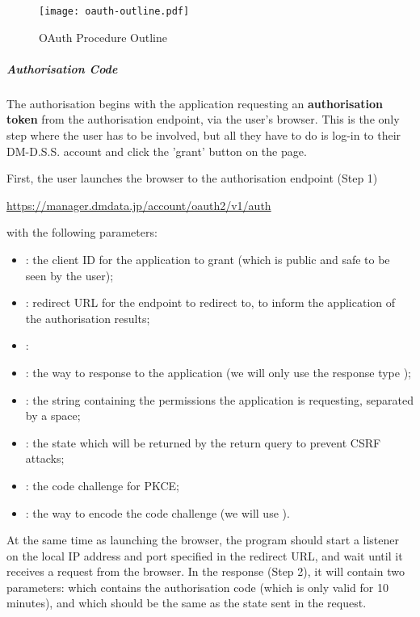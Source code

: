 \begin{figure}[htp]
    \centering
    \texttt{[image: oauth-outline.pdf]}
    \caption{OAuth Procedure Outline}
    \label{fig:oauth-outline}
\end{figure}

\subparagraph{Authorisation Code}

The authorisation begins with the application requesting an \textbf{authorisation token} from the authorisation endpoint, via the user's browser. This is the only step where the user has to be involved, but all they have to do is log-in to their DM-D.S.S. account and click the 'grant' button on the page.

First, the user launches the browser to the authorisation endpoint (Step 1)
\begin{center}
    \url{https://manager.dmdata.jp/account/oauth2/v1/auth}
\end{center}
with the following parameters:
\begin{itemize}
    \item {}: the client ID for the application to grant (which is public and safe to be seen by the user);
    \item {}: redirect URL for the endpoint to redirect to, to inform the application of the authorisation results;
    \item {}: 
    \item {}: the way to response to the application (we will only use the response type );
    \item {}: the string containing the permissions the application is requesting, separated by a space;
    \item {}: the state which will be returned by the return query to prevent CSRF attacks;
    \item {}: the code challenge for PKCE;
    \item {}: the way to encode the code challenge (we will use ).
\end{itemize}

At the same time as launching the browser, the program should start a listener on the local IP address and port specified in the redirect URL, and wait until it receives a request from the browser. In the response (Step 2), it will contain two parameters:  which contains the authorisation code (which is only valid for 10 minutes), and  which should be the same as the state sent in the request.

